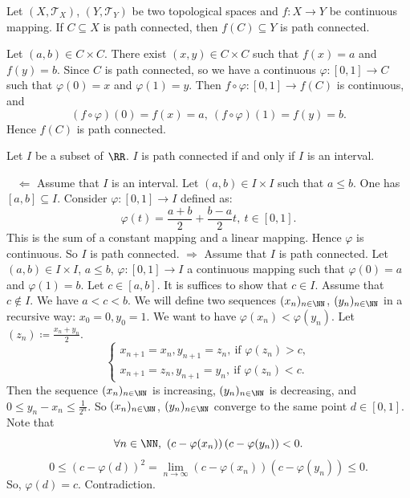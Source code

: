 \begin{propositionenv}
    Let $(X,\mathscr{T}_X)$, $(Y,\mathscr{T}_Y)$ be two topological spaces and $f:X\longrightarrow Y$ be continuous mapping. If $C\subseteq X$ is path connected, then $f(C)\subseteq Y$ is path connected.
\end{propositionenv}
\begin{proofenv}
    Let $(a,b)\in C\times C$. There exist $(x,y)\in C\times C$ such that $f(x)=a$ and $f(y)=b$. Since $C$ is path connected, so we have a continuous $\varphi: [0,1]\longrightarrow C$ such that $\varphi(0)=x$ and $\varphi(1)=y$. Then $f\circ \varphi: [0,1]\longrightarrow f(C)$ is continuous, and 
    $$\left(f\circ\varphi\right)(0)=f(x)=a,\ \left(f\circ\varphi\right)(1)=f(y)=b.$$
    Hence $f(C)$ is path connected.
\end{proofenv}
\begin{theoremenv}
    Let $I$ be a subset of $\RR$. $I$ is path connected if and only if $I$ is an interval.
\end{theoremenv}
\begin{proofenv}
    \ \newline
    $\Leftarrow$ Assume that $I$ is an interval. Let $(a,b)\in I\times I$ such that $a\le b$. One has $[a,b]\subseteq I$. Consider $\varphi:[0,1]\longrightarrow I$ defined as:
    $$\varphi(t)=\frac{a+b}{2}+\frac{b-a}{2}t,\ t\in [0,1].$$
    This is the sum of a constant mapping and a linear mapping. Hence $\varphi$ is continuous. So $I$ is path connected.
    \newline
    $\Rightarrow$ Assume that $I$ is path connected. Let $(a,b)\in I\times I$, $a\le b$, $\varphi :[0,1]\longrightarrow I$ a continuous mapping such that $\varphi(0)=a$ and $\varphi(1)=b$. Let $c\in [a,b]$. It is suffices to show that $c\in I$. Assume that $c\notin I$. We have $a<c<b$. We will define two sequences $(x_n)_{n\in \NN}$, $(y_n)_{n\in \NN}$ in a recursive way: $x_0=0, y_0=1$. We want to have $\varphi(x_n)<\varphi(y_n)$. Let $(z_n)\coloneq \frac{x_n+y_n}{2}$.
    $$\begin{cases}
        x_{n+1}=x_n, y_{n+1}=z_n,\ \text{if }\varphi(z_n)>c,\\
        x_{n+1}=z_n, y_{n+1}=y_n,\ \text{if }\varphi(z_n)<c.
    \end{cases}$$
    Then the sequence $(x_n)_{n\in \NN}$ is increasing, $(y_n)_{n\in\NN}$ is decreasing, and $0\le y_n-x_n\le \frac{1}{2^n}$. So $(x_n)_{n\in\NN}$, $(y_n)_{n\in\NN}$ converge to the same point $d\in [0,1]$. Note that 
    $$\forall n\in \NN,\ \left(c-\varphi(x_n)\right)\left(c-\varphi(y_n)\right)<0.$$
    $$0\le \left(c-\varphi(d)\right)^2=\lim_{n\rightarrow \infty}\left(c-\varphi(x_n)\right)\left(c-\varphi(y_n)\right)\le0.$$
    So, $\varphi(d)=c$. Contradiction.
\end{proofenv}
